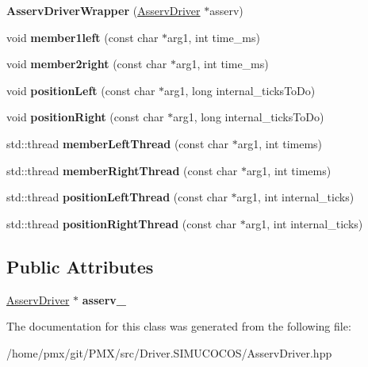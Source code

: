 \begin{DoxyCompactItemize}
\item 
\mbox{\label{classAsservDriverWrapper_ac9cdc2a725579a0e67e3e5d70fea98ff}} 
{\bfseries Asserv\+Driver\+Wrapper} (\hyperlink{classAsservDriver}{Asserv\+Driver} $\ast$asserv)
\item 
\mbox{\label{classAsservDriverWrapper_a4d3b337fd6beed104ba60b69213344cc}} 
void {\bfseries member1left} (const char $\ast$arg1, int time\+\_\+ms)
\item 
\mbox{\label{classAsservDriverWrapper_af356c1725a4b8dac9994dd0d94e12069}} 
void {\bfseries member2right} (const char $\ast$arg1, int time\+\_\+ms)
\item 
\mbox{\label{classAsservDriverWrapper_aad45be064ecfd5eed9c687875f0e92e5}} 
void {\bfseries position\+Left} (const char $\ast$arg1, long internal\+\_\+ticks\+To\+Do)
\item 
\mbox{\label{classAsservDriverWrapper_a4642069f82e26bf54045931a819a4d84}} 
void {\bfseries position\+Right} (const char $\ast$arg1, long internal\+\_\+ticks\+To\+Do)
\item 
\mbox{\label{classAsservDriverWrapper_a6d2ba86845397e2a65e62660f7d94710}} 
std\+::thread {\bfseries member\+Left\+Thread} (const char $\ast$arg1, int timems)
\item 
\mbox{\label{classAsservDriverWrapper_af629788681c4e3155c9fc56d6a783d8a}} 
std\+::thread {\bfseries member\+Right\+Thread} (const char $\ast$arg1, int timems)
\item 
\mbox{\label{classAsservDriverWrapper_a8c951da2eafa9448971f7f68088edec8}} 
std\+::thread {\bfseries position\+Left\+Thread} (const char $\ast$arg1, int internal\+\_\+ticks)
\item 
\mbox{\label{classAsservDriverWrapper_a0851aa582a82bf4cf9de2dcf240d585e}} 
std\+::thread {\bfseries position\+Right\+Thread} (const char $\ast$arg1, int internal\+\_\+ticks)
\end{DoxyCompactItemize}
\subsection*{Public Attributes}
\begin{DoxyCompactItemize}
\item 
\mbox{\label{classAsservDriverWrapper_abf6d7798ba8a1ae877c053edaf3f1d6a}} 
\hyperlink{classAsservDriver}{Asserv\+Driver} $\ast$ {\bfseries asserv\+\_\+}
\end{DoxyCompactItemize}


The documentation for this class was generated from the following file\+:\begin{DoxyCompactItemize}
\item 
/home/pmx/git/\+P\+M\+X/src/\+Driver.\+S\+I\+M\+U\+C\+O\+C\+O\+S/Asserv\+Driver.\+hpp\end{DoxyCompactItemize}
